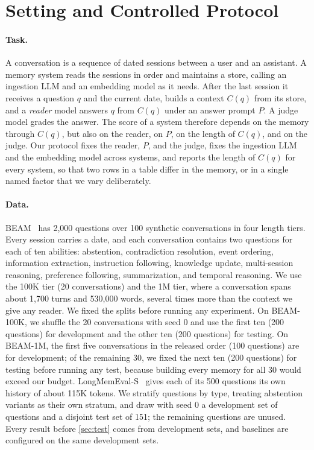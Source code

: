 \section{Setting and Controlled Protocol}
\label{sec:setting}

\paragraph{Task.}
A conversation is a sequence of dated sessions between a user and an assistant. A memory system reads the sessions in
order and maintains a store, calling an ingestion LLM and an embedding model as it needs. After the last session it
receives a question $q$ and the current date, builds a context $C(q)$ from its store, and a \emph{reader} model answers
$q$ from $C(q)$ under an answer prompt $P$. A judge model grades the answer. The score of a system therefore depends on
the memory through $C(q)$, but also on the reader, on $P$, on the length of $C(q)$, and on the judge. Our protocol
fixes the reader, $P$, and the judge, fixes the ingestion LLM and the embedding model across systems, and reports the
length of $C(q)$ for every system, so that two rows in a table differ in the memory, or in a single named factor
that we vary deliberately.

\paragraph{Data.}
BEAM~\citep{tavakoli2025beam} has 2,000 questions over 100 synthetic conversations in four length tiers. Every
session carries a date, and each conversation contains two questions for each of ten abilities: abstention,
contradiction resolution, event ordering, information extraction, instruction following, knowledge update,
multi-session reasoning, preference following, summarization, and temporal reasoning. We use the 100K tier
(20 conversations) and the 1M tier, where a conversation spans about 1,700 turns and 530,000 words, several times
more than the context we give any reader. We fixed the splits before running any experiment. On BEAM-100K, we
shuffle the 20 conversations with seed 0 and use the first ten (200 questions) for development and the other ten
(200 questions) for testing. On BEAM-1M, the first five conversations in the released order (100 questions) are
for development; of the remaining 30, we fixed the next ten (200 questions) for testing before running any test, because building every memory for all 30 would exceed our budget.
LongMemEval-S~\citep{wu2025longmemeval} gives each of its 500 questions its own history of about 115K tokens. We
stratify questions by type, treating abstention variants as their own stratum, and draw with seed 0 a development set
of  questions and a disjoint test set of 151; the remaining questions are unused. Every result before
\cref{sec:test} comes from development sets, and baselines are configured on the same development sets.

